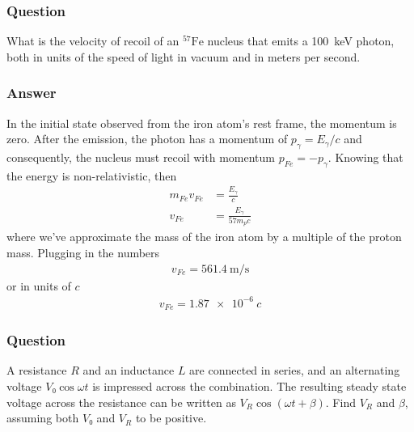 \subsubsection{Question}

What is the velocity of recoil of an ${}^{57}\mathrm{Fe}$ nucleus that emits
a \SI{100}{\keV} photon, both in units of the speed of light in vacuum and in
meters per second.

\subsubsection{Answer}

In the initial state observed from the iron atom's rest frame, the momentum
is zero. After the emission, the photon has a momentum of $p_γ = E_γ/c$ and
consequently, the nucleus must recoil with momentum $p_{Fe} = -p_γ$. Knowing
that the energy is non-relativistic, then
\begin{align*}
    m_{Fe}v_{Fe} &= \frac{E_γ}{c} \\
    v_{Fe} &= \frac{E_γ}{57m_p c}
\end{align*}
where we've approximate the mass of the iron atom by a multiple of the proton
mass. Plugging in the numbers
\begin{align}
    \boxed{ v_{Fe} = \SI{561.4}{\m\per\s} }
\end{align}
or in units of $c$
\begin{align}
    \boxed{ v_{Fe} = \SI{1.87e-6}{c} }
\end{align}

\subsubsection{Question}

A resistance $R$ and an inductance $L$ are connected in series, and an
alternating voltage $V₀\cos ωt$ is impressed across the combination. The
resulting steady state voltage across the resistance can be written as $V_R
\cos(ωt + β)$. Find $V_R$ and $β$, assuming both $V₀$ and $V_R$ to be
positive.

